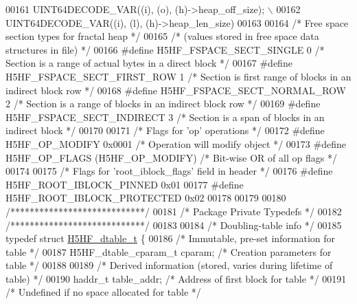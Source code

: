 \begin{DoxyCode}
00161 \textcolor{preprocessor}{    UINT64DECODE\_VAR((i), (o), (h)->heap\_off\_size);                           \(\backslash\)}
00162 \textcolor{preprocessor}{    UINT64DECODE\_VAR((i), (l), (h)->heap\_len\_size)}
00163 
00164 \textcolor{comment}{/* Free space section types for fractal heap */}
00165 \textcolor{comment}{/* (values stored in free space data structures in file) */}
00166 \textcolor{preprocessor}{#define H5HF\_FSPACE\_SECT\_SINGLE         0       }\textcolor{comment}{/* Section is a range of actual bytes in a direct block */}\textcolor{preprocessor}{}
00167 \textcolor{preprocessor}{#define H5HF\_FSPACE\_SECT\_FIRST\_ROW      1       }\textcolor{comment}{/* Section is first range of blocks in an indirect block
       row */}\textcolor{preprocessor}{}
00168 \textcolor{preprocessor}{#define H5HF\_FSPACE\_SECT\_NORMAL\_ROW     2       }\textcolor{comment}{/* Section is a range of blocks in an indirect block row */}\textcolor{preprocessor}{}
00169 \textcolor{preprocessor}{#define H5HF\_FSPACE\_SECT\_INDIRECT       3       }\textcolor{comment}{/* Section is a span of blocks in an indirect block */}\textcolor{preprocessor}{}
00170 
00171 \textcolor{comment}{/* Flags for 'op' operations */}
00172 \textcolor{preprocessor}{#define H5HF\_OP\_MODIFY          0x0001          }\textcolor{comment}{/* Operation will modify object */}\textcolor{preprocessor}{}
00173 \textcolor{preprocessor}{#define H5HF\_OP\_FLAGS           (H5HF\_OP\_MODIFY)        }\textcolor{comment}{/* Bit-wise OR of all op flags */}\textcolor{preprocessor}{}
00174 
00175 \textcolor{comment}{/* Flags for 'root\_iblock\_flags' field in header */}
00176 \textcolor{preprocessor}{#define H5HF\_ROOT\_IBLOCK\_PINNED         0x01}
00177 \textcolor{preprocessor}{#define H5HF\_ROOT\_IBLOCK\_PROTECTED      0x02}
00178 
00179 
00180 \textcolor{comment}{/****************************/}
00181 \textcolor{comment}{/* Package Private Typedefs */}
00182 \textcolor{comment}{/****************************/}
00183 
00184 \textcolor{comment}{/* Doubling-table info */}
00185 \textcolor{keyword}{typedef} \textcolor{keyword}{struct }\hyperlink{struct_h5_h_f__dtable__t}{H5HF\_dtable\_t} \{
00186     \textcolor{comment}{/* Immutable, pre-set information for table */}
00187     H5HF\_dtable\_cparam\_t    cparam;     \textcolor{comment}{/* Creation parameters for table */}
00188 
00189     \textcolor{comment}{/* Derived information (stored, varies during lifetime of table) */}
00190     haddr\_t     table\_addr;     \textcolor{comment}{/* Address of first block for table */}
00191                                 \textcolor{comment}{/* Undefined if no space allocated for table */}

\end{DoxyCode}
